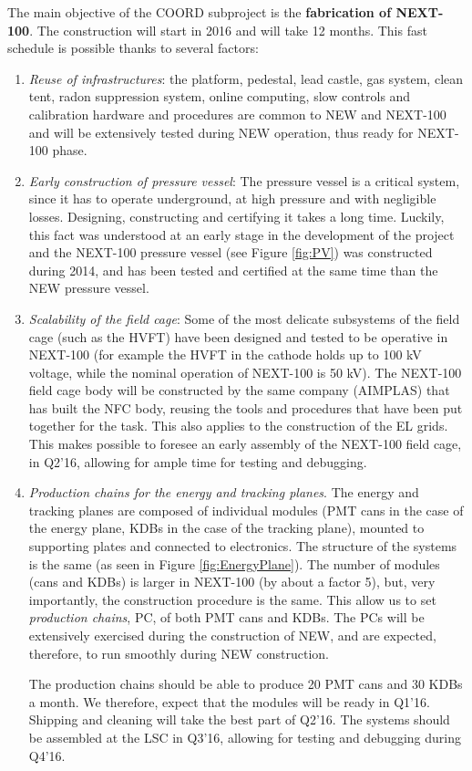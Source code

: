 The main objective of the COORD subproject is the {\bf fabrication of NEXT-100}. The construction will start in 2016 and will take 12 months. This fast schedule is possible thanks to several factors:
%
\begin{enumerate}
\item {\em Reuse of infrastructures}: the platform, pedestal, lead castle, gas system, clean tent, radon suppression system, online computing, slow controls and calibration hardware and procedures are common to NEW and NEXT-100 and will be extensively tested during NEW operation, thus ready for NEXT-100 phase.
\item {\em Early construction of pressure vessel}: The pressure vessel is a critical system, since it has to operate underground, at high pressure and with negligible losses. Designing, constructing and certifying it takes a long time. Luckily, this fact was understood at an early stage in the development of the project and the NEXT-100 pressure vessel (see Figure \ref{fig:PV}) was constructed during 2014, and has been tested and certified at the same time than the NEW pressure vessel. 
\item {\em Scalability of the field cage}: Some of the most delicate subsystems of the field cage (such as the HVFT) have been designed and tested to be operative in NEXT-100 (for example the HVFT in the cathode holds up to 100 kV voltage, while the nominal operation of NEXT-100 is 50 kV). The NEXT-100 field cage body will be constructed by the same company (AIMPLAS) that has built the NFC body, reusing the tools and procedures that have been put together for the task. This also applies to the construction of the EL grids. 
This makes possible to foresee an early assembly of the NEXT-100 field cage, in Q2'16, allowing for ample time for testing and debugging.

\item {\em Production chains for the energy and tracking planes}. The energy and tracking planes are composed of individual modules (PMT cans in the case of the energy plane, KDBs in the case of the tracking plane), mounted to supporting plates and connected to electronics. The structure of the systems is the same (as seen in Figure \ref{fig:EnergyPlane}). The number of modules (cans and KDBs) is larger in NEXT-100 (by about a factor 5), but, very importantly, the construction procedure is the same. This allow us to set {\em production chains}, PC, of both PMT cans and KDBs. The PCs will be extensively exercised during the construction of NEW, and are expected, therefore, to run smoothly during NEW construction.  

The production chains should be able to produce 20 PMT cans and 30 KDBs a month. We therefore, expect that the modules will be ready in Q1'16. Shipping and cleaning will take the best part of Q2'16. The systems should be assembled at the LSC in Q3'16, allowing for testing and debugging during Q4'16.
\end{enumerate}